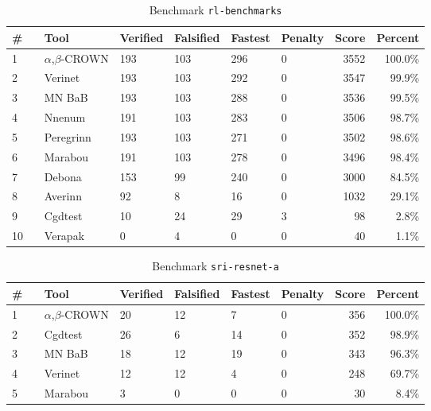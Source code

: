 
\begin{table}[h]
\begin{center}
\caption{Benchmark \texttt{rl-benchmarks}} \label{tab:cat_{cat}}
{\setlength{\tabcolsep}{2pt}
\begin{tabular}[h]{@{}llllllrr@{}}
\toprule
\textbf{\# ~} & \textbf{Tool} & \textbf{Verified} & \textbf{Falsified} & \textbf{Fastest} & \textbf{Penalty} & \textbf{Score} & \textbf{Percent}\\
\midrule
1 & $\alpha$,$\beta$-CROWN & 193 & 103 & 296 & 0 & 3552 & 100.0\% \\
2 & Verinet & 193 & 103 & 292 & 0 & 3547 & 99.9\% \\
3 & MN BaB & 193 & 103 & 288 & 0 & 3536 & 99.5\% \\
4 & Nnenum & 191 & 103 & 283 & 0 & 3506 & 98.7\% \\
5 & Peregrinn & 193 & 103 & 271 & 0 & 3502 & 98.6\% \\
6 & Marabou & 191 & 103 & 278 & 0 & 3496 & 98.4\% \\
7 & Debona & 153 & 99 & 240 & 0 & 3000 & 84.5\% \\
8 & Averinn & 92 & 8 & 16 & 0 & 1032 & 29.1\% \\
9 & Cgdtest & 10 & 24 & 29 & 3 & 98 & 2.8\% \\
10 & Verapak & 0 & 4 & 0 & 0 & 40 & 1.1\% \\
\bottomrule
\end{tabular}
}
\end{center}
\end{table}




\begin{table}[h]
\begin{center}
\caption{Benchmark \texttt{sri-resnet-a}} \label{tab:cat_{cat}}
{\setlength{\tabcolsep}{2pt}
\begin{tabular}[h]{@{}llllllrr@{}}
\toprule
\textbf{\# ~} & \textbf{Tool} & \textbf{Verified} & \textbf{Falsified} & \textbf{Fastest} & \textbf{Penalty} & \textbf{Score} & \textbf{Percent}\\
\midrule
1 & $\alpha$,$\beta$-CROWN & 20 & 12 & 7 & 0 & 356 & 100.0\% \\
2 & Cgdtest & 26 & 6 & 14 & 0 & 352 & 98.9\% \\
3 & MN BaB & 18 & 12 & 19 & 0 & 343 & 96.3\% \\
4 & Verinet & 12 & 12 & 4 & 0 & 248 & 69.7\% \\
5 & Marabou & 3 & 0 & 0 & 0 & 30 & 8.4\% \\
\bottomrule
\end{tabular}
}
\end{center}
\end{table}



